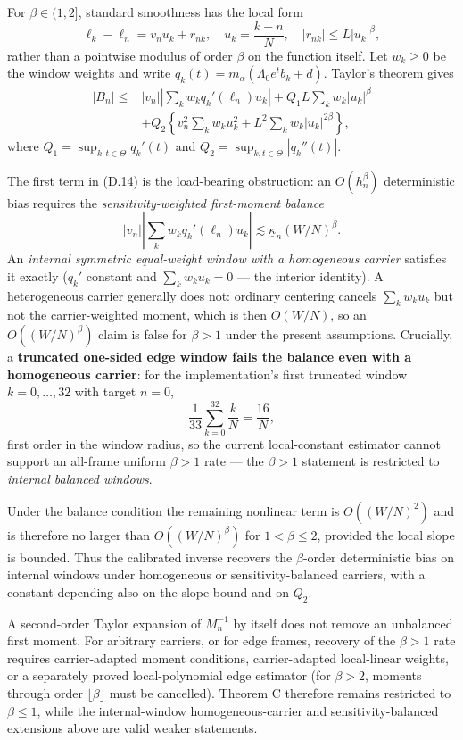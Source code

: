 For $\beta\in(1,2]$, standard smoothness has the local form
\[
\ell_k-\ell_n=v_nu_k+r_{nk},\quad
u_k=\frac{k-n}{N},\quad
|r_{nk}|\le L|u_k|^\beta,
\]
rather than a pointwise modulus of order $\beta$ on the function
itself. Let $w_k\ge0$ be the window weights and write
$q_k(t)=m_\alpha(\Lambda_0e^tb_k+d)$. Taylor's theorem gives
\[
\begin{aligned}
|B_n|\le{}&
|v_n|\left|\sum_kw_kq_k'(\ell_n)u_k\right|
+Q_1L\sum_kw_k|u_k|^\beta\\
&+Q_2\left\{v_n^2\sum_kw_ku_k^2+L^2\sum_kw_k|u_k|^{2\beta}\right\},
\end{aligned}
\tag{D.14}
\]
where $Q_1=\sup_{k,t\in\Theta}q_k'(t)$ and
$Q_2=\sup_{k,t\in\Theta}|q_k''(t)|$.

The first term in (D.14) is the load-bearing obstruction: an
$O(h_n^\beta)$ deterministic bias requires the
\emph{sensitivity-weighted first-moment balance}
\[
|v_n|\left|\sum_kw_kq_k'(\ell_n)u_k\right|\lesssim\underline\kappa_n(W/N)^\beta .
\]
An \emph{internal symmetric equal-weight window with a homogeneous
carrier} satisfies it exactly ($q_k'$ constant and
$\sum_kw_ku_k=0$ --- the interior identity). A heterogeneous carrier
generally does not: ordinary centering cancels $\sum_kw_ku_k$ but not
the carrier-weighted moment, which is then $O(W/N)$, so an
$O((W/N)^\beta)$ claim is false for $\beta>1$ under the present
assumptions. Crucially, a \textbf{truncated one-sided edge window
fails the balance even with a homogeneous carrier}: for the
implementation's first truncated window $k=0,\dots,32$ with target
$n=0$,
\[
\frac1{33}\sum_{k=0}^{32}\frac kN=\frac{16}{N},
\]
first order in the window radius, so the current local-constant
estimator cannot support an all-frame uniform $\beta>1$ rate ---
the $\beta>1$ statement is restricted to \emph{internal balanced
windows}.

Under the balance condition the remaining nonlinear term
is $O((W/N)^2)$ and is therefore no larger than $O((W/N)^\beta)$ for
$1<\beta\le2$, provided the local slope is bounded. Thus the
calibrated inverse recovers the $\beta$-order deterministic bias
on internal windows under homogeneous or sensitivity-balanced
carriers, with a constant depending also on the slope bound and on
$Q_2$.

A second-order Taylor expansion of $M_n^{-1}$ by itself does not
remove an unbalanced first moment. For arbitrary carriers, or for
edge frames, recovery of the $\beta>1$ rate requires carrier-adapted
moment conditions, carrier-adapted local-linear weights, or a
separately proved local-polynomial edge estimator (for $\beta>2$,
moments through order $\lfloor\beta\rfloor$ must be cancelled).
Theorem C therefore remains restricted to
$\beta\le1$, while the internal-window homogeneous-carrier and
sensitivity-balanced extensions above are valid weaker statements.

